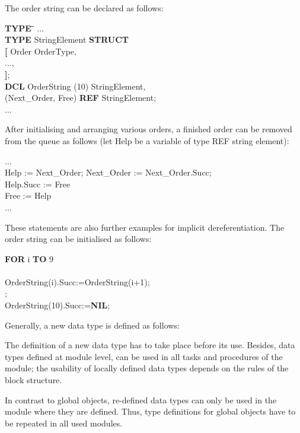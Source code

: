 \begin{enumerate}
The order string can be declared as follows:

\begin{tabbing}
{\bf TYPE} \= \x \= \x \= \kill
... \> \> \> \\
{\bf TYPE} \> StringElement {\bf STRUCT} \> \> \\
           \>   \> {\bf [} \> Order  OrderType,\\
           \>   \>         \> ...,\\
           \>   \> {\bf ]};\\
{\bf DCL}  \> OrderString (10) StringElement, \> \> \\
           \> (Next\_Order, Free) {\bf REF} StringElement;\\
... \> \> \>
\end{tabbing}

After initialising and arranging various orders, a finished order can be
removed from the queue as follows (let Help be a variable of type REF
string element):

...\\
Help := Next\_Order;
Next\_Order := Next\_Order.Succ;\\
Help.Succ := Free\\
Free := Help\\
...

These statements are also further examples for implicit
dereferentiation. The order string can be initialised as follows:

{\bf FOR} i {\bf TO} 9\\
 \\
\x \x OrderString(i).Succ:=OrderString(i+1);\\
;\\
OrderString(10).Succ:={\bf NIL};
\end{enumerate}

Generally, a new data type is defined as follows:



The definition of a new data type has to take place before its use.
Besides, data types defined at module level, can be used in all tasks
and procedures of the module; the usability of locally defined data
types depends on the rules of the block structure.

In contrast to global objects, re-defined data types can only be used
in the module where they are defined. Thus, type definitions for
global objects have to be repeated in all used modules.

